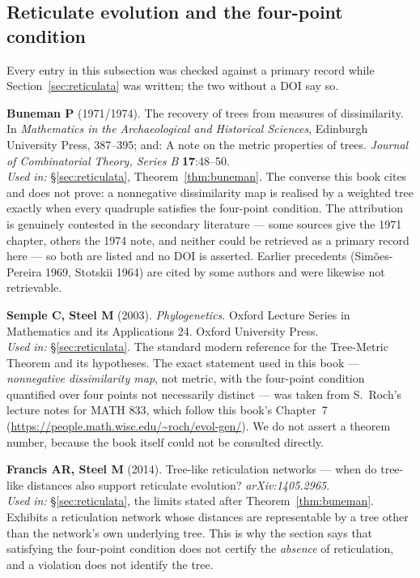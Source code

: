 \subsection*{Reticulate evolution and the four-point condition}

Every entry in this subsection was checked against a primary record while
Section~\ref{sec:reticulata} was written; the two without a DOI say so.

\begin{refs}
\item \textbf{Buneman P} (1971/1974). The recovery of trees from measures of
dissimilarity. In \emph{Mathematics in the Archaeological and Historical
Sciences}, Edinburgh University Press, 387--395; and: A note on the metric
properties of trees. \emph{Journal of Combinatorial Theory, Series B}
\textbf{17}:48--50. \nodoi
\\[0.15em]
\emph{Used in:} §\ref{sec:reticulata}, Theorem~\ref{thm:buneman}. The converse
this book cites and does not prove: a nonnegative dissimilarity map is realised
by a weighted tree exactly when every quadruple satisfies the four-point
condition. The attribution is genuinely contested in the secondary literature
--- some sources give the 1971 chapter, others the 1974 note, and neither could
be retrieved as a primary record here --- so both are listed and no DOI is
asserted. Earlier precedents (Simões-Pereira 1969, Stotskii 1964) are cited by
some authors and were likewise not retrievable.

\item \textbf{Semple C, Steel M} (2003). \emph{Phylogenetics}. Oxford Lecture
Series in Mathematics and its Applications 24. Oxford University Press. \nodoi
\\[0.15em]
\emph{Used in:} §\ref{sec:reticulata}. The standard modern reference for the
Tree-Metric Theorem and its hypotheses. The exact statement used in this book
--- \emph{nonnegative dissimilarity map}, not metric, with the four-point
condition quantified over four points not necessarily distinct --- was taken
from S.~Roch's lecture notes for MATH 833, which follow this book's Chapter~7
(\url{https://people.math.wisc.edu/~roch/evol-gen/}). We do not assert a theorem
number, because the book itself could not be consulted directly.

\item \textbf{Francis AR, Steel M} (2014). Tree-like reticulation networks ---
when do tree-like distances also support reticulate evolution?
\emph{arXiv:1405.2965}. \nodoi
\\[0.15em]
\emph{Used in:} §\ref{sec:reticulata}, the limits stated after
Theorem~\ref{thm:buneman}. Exhibits a reticulation network whose distances are
representable by a tree other than the network's own underlying tree. This is
why the section says that satisfying the four-point condition does not certify
the \emph{absence} of reticulation, and a violation does not identify the tree.


\end{refs}
